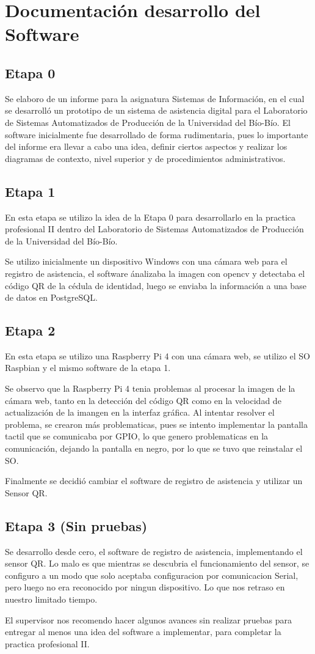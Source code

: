 \documentclass{templateReport}
\newcommand{\newparagraph}{\par\vspace{\baselineskip}\noindent}
\begin{document}
\newpage
\section{Documentación desarrollo del Software}
\subsection{Etapa 0}
Se elaboro de un informe para la asignatura Sistemas de Información, en el cual se desarrolló un prototipo de un sistema de asistencia digital para el Laboratorio de Sistemas Automatizados de Producción de la Universidad del Bío-Bío.
El software inicialmente fue desarrollado de forma rudimentaria, pues lo importante del informe era llevar a cabo una idea, definir ciertos aspectos y realizar los diagramas de contexto, nivel superior y de procedimientos administrativos.

\subsection{Etapa 1}
En esta etapa se utilizo la idea de la Etapa 0 para desarrollarlo en la practica profesional II dentro del Laboratorio de Sistemas Automatizados de Producción de la Universidad del Bío-Bío.
\newparagraph
Se utilizo inicialmente un dispositivo Windows con una cámara web para el registro de asistencia, el software ánalizaba la imagen con opencv y detectaba el código QR de la cédula de identidad, luego se enviaba la información a una base de datos en PostgreSQL.

\subsection{Etapa 2}
En esta etapa se utilizo una Raspberry Pi 4 con una cámara web, se utilizo el SO Raspbian y el mismo software de la etapa 1.
\newparagraph
Se observo que la Raspberry Pi 4 tenia problemas al procesar la imagen de la cámara web, tanto en la detección del código QR como en la velocidad de actualización de la imangen en la interfaz gráfica.
Al intentar resolver el problema, se crearon más problematicas, pues se intento implementar la pantalla tactil que se comunicaba por GPIO, lo que genero problematicas en la comunicación, dejando la pantalla en negro, por lo que se tuvo que reinstalar el SO.
\newparagraph
Finalmente se decidió cambiar el software de registro de asistencia y utilizar un Sensor QR.

\subsection{Etapa 3 (Sin pruebas)}
Se desarrollo desde cero, el software de registro de asistencia, implementando el sensor QR.
Lo malo es que mientras se descubria el funcionamiento del sensor, se configuro a un modo que solo aceptaba configuracion por comunicacion Serial, pero luego no era reconocido por ningun dispositivo. Lo que nos retraso en nuestro limitado tiempo.
\newparagraph
El supervisor nos recomendo hacer algunos avances sin realizar pruebas para entregar al menos una idea del software a implementar, para completar la practica profesional II.
\end{document}
